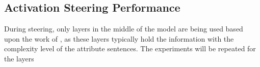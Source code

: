 \subsection{Activation Steering Performance}
During steering, only layers in the middle of the model are being used based upon the work of \citet{konenStyleVectorsSteering2024,bogdanEmergentEffectsScaling2025}, as these layers typically hold the information with the complexity level of the attribute sentences. The experiments will be repeated for the layers %
